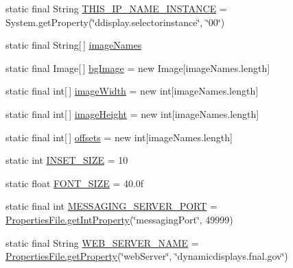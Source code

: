 \begin{DoxyCompactItemize}
static final String \hyperlink{classgov_1_1fnal_1_1ppd_1_1dd_1_1GlobalVariables_ae5fe9c75fedaa742e5f68baad8768d7f}{T\-H\-I\-S\-\_\-\-I\-P\-\_\-\-N\-A\-M\-E\-\_\-\-I\-N\-S\-T\-A\-N\-C\-E} = System.\-get\-Property(\char`\"{}ddisplay.\-selectorinstance\char`\"{}, \char`\"{}00\char`\"{})
\item 
static final String\mbox{[}$\,$\mbox{]} \hyperlink{classgov_1_1fnal_1_1ppd_1_1dd_1_1GlobalVariables_a356be5e37e706b201f6bc26130b73ce3}{image\-Names}
\item 
static final Image\mbox{[}$\,$\mbox{]} \hyperlink{classgov_1_1fnal_1_1ppd_1_1dd_1_1GlobalVariables_a912d45efb46176a8ccd9ce8e046695b0}{bg\-Image} = new Image\mbox{[}image\-Names.\-length\mbox{]}
\item 
static final int\mbox{[}$\,$\mbox{]} \hyperlink{classgov_1_1fnal_1_1ppd_1_1dd_1_1GlobalVariables_a88625f4c1de90b1b1bb20c05fd993617}{image\-Width} = new int\mbox{[}image\-Names.\-length\mbox{]}
\item 
static final int\mbox{[}$\,$\mbox{]} \hyperlink{classgov_1_1fnal_1_1ppd_1_1dd_1_1GlobalVariables_a4c27cf0455687a5f58b71ae0d20fd671}{image\-Height} = new int\mbox{[}image\-Names.\-length\mbox{]}
\item 
static final int\mbox{[}$\,$\mbox{]} \hyperlink{classgov_1_1fnal_1_1ppd_1_1dd_1_1GlobalVariables_aa46c72aaa61e4f90401679376f6071f5}{offsets} = new int\mbox{[}image\-Names.\-length\mbox{]}
\item 
static int \hyperlink{classgov_1_1fnal_1_1ppd_1_1dd_1_1GlobalVariables_a938952f27836544cbcf8eed0fceecb99}{I\-N\-S\-E\-T\-\_\-\-S\-I\-Z\-E} = 10
\item 
static float \hyperlink{classgov_1_1fnal_1_1ppd_1_1dd_1_1GlobalVariables_a9331af89f789ea1b54581c0198f7a43d}{F\-O\-N\-T\-\_\-\-S\-I\-Z\-E} = 40.\-0f
\item 
static final int \hyperlink{classgov_1_1fnal_1_1ppd_1_1dd_1_1GlobalVariables_a3afb8f4fd1dbbc82329ea9ff4aa3629e}{M\-E\-S\-S\-A\-G\-I\-N\-G\-\_\-\-S\-E\-R\-V\-E\-R\-\_\-\-P\-O\-R\-T} = \hyperlink{classgov_1_1fnal_1_1ppd_1_1dd_1_1util_1_1PropertiesFile_a7c94841a2b3e49c8c26bc8a45ce7e1f6}{Properties\-File.\-get\-Int\-Property}(\char`\"{}messaging\-Port\char`\"{}, 49999)
\item 
static final String \hyperlink{classgov_1_1fnal_1_1ppd_1_1dd_1_1GlobalVariables_af5ffb15826513fabba402ec017edbc70}{W\-E\-B\-\_\-\-S\-E\-R\-V\-E\-R\-\_\-\-N\-A\-M\-E} = \hyperlink{classgov_1_1fnal_1_1ppd_1_1dd_1_1util_1_1PropertiesFile_a72138f25e2d2cc91abfe8ce18b5d2eb3}{Properties\-File.\-get\-Property}(\char`\"{}web\-Server\char`\"{}, \char`\"{}dynamicdisplays.\-fnal.\-gov\char`\"{})

\end{DoxyCompactItemize}
